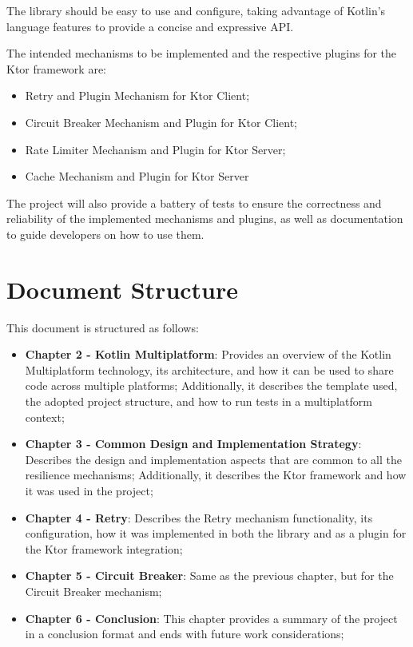 The library should be easy to use and configure, taking advantage of Kotlin's language features to provide a concise and expressive API.

The intended mechanisms to be implemented and the respective plugins for the Ktor framework are:

\begin{itemize}
    \item Retry and Plugin Mechanism for Ktor Client;
    \item Circuit Breaker Mechanism and Plugin for Ktor Client;
    \item Rate Limiter Mechanism and Plugin for Ktor Server;
    \item Cache Mechanism and Plugin for Ktor Server
\end{itemize}

The project will also provide a battery of tests
to ensure the correctness and reliability of the implemented mechanisms and plugins,
as well as documentation to guide developers on how to use them.


\section{Document Structure}\label{sec:document-structure}

This document is structured as follows:

\begin{itemize}
    \item \textbf{Chapter 2 - Kotlin Multiplatform}: Provides an overview of the Kotlin Multiplatform technology, its architecture, and how it can be used to share code across multiple platforms; Additionally, it describes the template used, the adopted project structure, and how to run tests in a multiplatform context;
    \item \textbf{Chapter 3 - Common Design and Implementation Strategy}: Describes the design and implementation aspects that are common to all the resilience mechanisms; Additionally, it describes the Ktor framework and how it was used in the project;
    \item \textbf{Chapter 4 - Retry}: Describes the Retry mechanism functionality, its configuration, how it was implemented in both the library and as a plugin for the Ktor framework integration;
    \item \textbf{Chapter 5 - Circuit Breaker}: Same as the previous chapter, but for the Circuit Breaker mechanism;
    \item \textbf{Chapter 6 - Conclusion}: This chapter provides a summary of the project in a conclusion format and ends with future work considerations;
\end{itemize}
